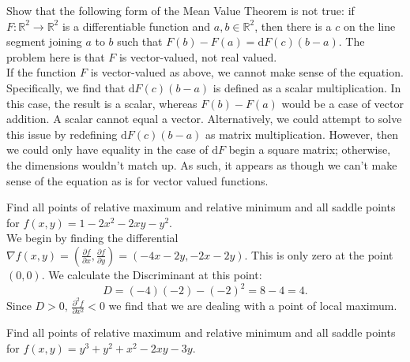 \documentclass[12pt]{book}
\newcommand{\R}{\mathbb{R}}
\newenvironment{exercise}[2][Exercise]{\begin{trivlist}
\item[\hskip \labelsep {\bfseries #1}\hskip \labelsep {\bfseries #2.}]}{\end{trivlist}}
\begin{document}
\begin{exercise}{7.2.7}
\begin{exercise}{9.5.6}
    Show that the following form of the Mean Value Theorem is not true: if $F:\R^2 \to \R^2$ is a differentiable function and $a,b \in \R^2$, then there is a $c$ on the line segment joining $a$ to $b$ such that $F(b) - F(a) = \text{d} F(c) (b-a)$. The problem here is that $F$ is vector-valued, not real valued.  \\

    If the function $F$ is vector-valued as above, we cannot make sense of the equation. Specifically, we find that $\text{d} F(c) (b-a)$ is defined as a scalar multiplication. In this case, the result is a scalar, whereas $F(b)-F(a)$ would be a case of vector addition. A scalar cannot equal a vector. Alternatively, we could attempt to solve this issue by redefining $\text{d} F(c) (b-a)$ as matrix multiplication. However, then we could only have equality in the case of $\text{d} F$ begin a square matrix; otherwise, the dimensions wouldn't match up. As such, it appears as though we can't make sense of the equation as is for vector valued functions.
\end{exercise}



\begin{exercise}{9.5.8}
    Find all points of relative maximum and relative minimum and all saddle points for $f(x,y) = 1 - 2 x^2 - 2 x y- y^2$.  \\

    We begin by finding the differential $\nabla f(x,y) = \left( \frac{\partial f}{\partial x}, \frac{\partial f}{\partial y} \right) = \left( -4x-2y, -2x-2y \right)$. This is only zero at the point $(0,0)$. We calculate the Discriminant at this point:
        \[ D = (-4)(-2)- (-2)^2 = 8 -4 = 4. \]
    Since $D>0, \, \frac{\partial^2 f}{\partial x^2} < 0$ we find that we are dealing with a point of local maximum.
\end{exercise}


\begin{exercise}{9.5.9}
    Find all  points of relative maximum and relative minimum and all saddle points for $f(x,y) = y^3 + y^2 +x^2 - 2 x y -3y$.  \\


\end{exercise}
\end{exercise}
\end{document}
